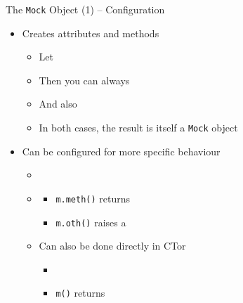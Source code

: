 
\begin{frame}{The \texttt{Mock} Object (1) -- Configuration}
%
\begin{itemize}
\item Creates attributes and methods 
	\begin{itemize}
	\item Let 
	\item Then you can always 
	\item And also 
	\item In both cases, the result is itself a \texttt{Mock} object
	\end{itemize}
\pause
\item Can be configured for more specific behaviour
	\begin{itemize}
	\item {}
	\item {}
		\begin{itemize}
		\item[\Thus] \texttt{m.meth()} returns 
		\item[\Thus] \texttt{m.oth()} raises a 
		\end{itemize}
	\item Can also be done directly in CTor
		\begin{itemize}
		\item[\Thus] 
		\item[\Thus] \texttt{m()} returns 
		\end{itemize}
	\end{itemize}
\end{itemize}
%
\end{frame}


